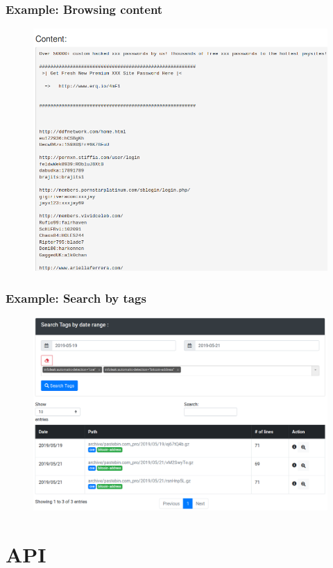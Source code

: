 \documentclass{beamer}
\begin{document}
\begin{frame}
    \frametitle{Example: Browsing content}
    \begin{figure}
        \includegraphics[scale=0.3, angle=0]{images/ail_06.png}
    \end{figure}
\end{frame}

\begin{frame}
    \frametitle{Example: Search by tags}
    \begin{figure}
        \includegraphics[scale=0.26, angle=0]{images/ail_14.png}
    \end{figure}
\end{frame}

\section{API}
\end{document}
